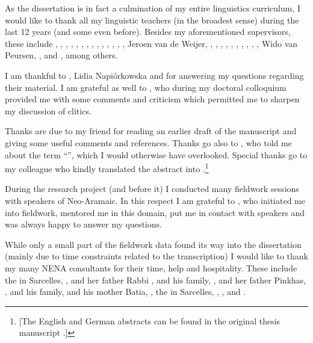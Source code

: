 As the dissertation is in fact a culmination of my entire linguistics curriculum, I would like to thank all my linguistic teachers (in the broadest sense) during the last 12 years (and some even before). Besides my aforementioned supervisors, these include
,
,
, 
,
,
,
,
,
,
,
,
,
,
,
Jeroen van de Weijer,
,
,
,
,
,
,
,
,
,
,
Wido van Peursen,
,
and , among others. 


I am thankful to , Lidia Napiórkowska and  for answering my questions regarding their material. I am grateful as well to , who during my doctoral colloquium provided me with some comments and criticism which permitted me to sharpen my discussion of clitics.  

Thanks are due to my friend  for reading an earlier draft of the manuscript and giving some useful comments and references. Thanks go also to , who told me about the term \enquote{}, which I would otherwise have overlooked. 
Special thanks go to my colleague  who kindly translated the  abstract into .\footnote{[The English and German abstracts can be found in the original thesis manuscript \citep{GutmanThesis}.]}

During the research project (and before it) I conducted many fieldwork sessions with speakers of Neo-Aramaic. In this respect I am grateful to , who initiated me into  fieldwork, mentored me in this domain, put me in contact with speakers and was always happy to answer my questions.

While only a small part of the fieldwork data found its way into the dissertation (mainly due to time constraints related to the transcription) I would like to thank my many NENA consultants for their time, help and hospitality. These include the  in Sarcelles, ,  and her father Rabbi ,  and his family, 
,  and her father Pinkhas, ,  and his family,  and his mother Batia, , the  in Sarcelles, , , and . %

